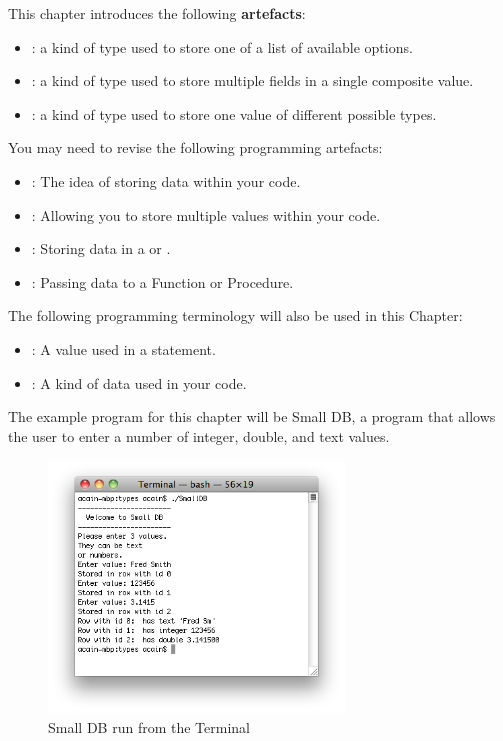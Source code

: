 This chapter introduces the following \textbf{artefacts}:
\begin{itemize}
  \item {}: a kind of type used to store one of a list of available options.
  \item {}: a kind of type used to store multiple fields in a single composite value.
  \item {}: a kind of type used to store one value of different possible types.
\end{itemize}

\bigskip

You may need to revise the following programming artefacts:
\begin{itemize}
  \item {}: The idea of storing data within your code.
  \item {}: Allowing you to store multiple values within your code.
  \item {}: Storing data in a  or .
  \item {}: Passing data to a Function or Procedure.
\end{itemize}

The following programming terminology will also be used in this Chapter:
\begin{itemize}
  \item {}: A value used in a statement.
  \item {}: A kind of data used in your code.
\end{itemize}

The example program for this chapter will be Small DB, a program that allows the user to enter a number of integer, double, and text values.

\begin{figure}[h]
   \centering
   \includegraphics[width=0.7\textwidth]{./topics/type-decl/images/SmallDB} 
   \caption{Small DB run from the Terminal}
   \label{fig:small-db}
\end{figure}


